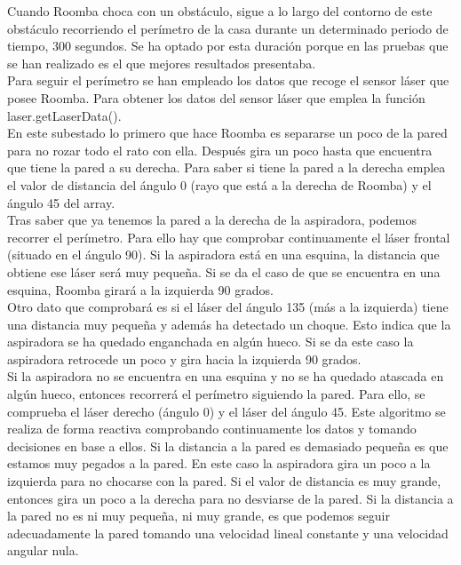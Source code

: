 Cuando Roomba choca con un obstáculo, sigue a lo largo del contorno de este obstáculo recorriendo el perímetro de la casa durante un determinado periodo de tiempo, 300 segundos. Se ha optado por esta duración porque en las pruebas que se han realizado es el que mejores resultados presentaba.\\

Para seguir el perímetro se han empleado los datos que recoge el sensor láser que posee Roomba. Para obtener los datos del sensor láser que emplea la función laser.getLaserData(). \\

En este subestado lo primero que hace Roomba es separarse un poco de la pared para no rozar todo el rato con ella. Después gira un poco hasta que encuentra que tiene la pared a su derecha. Para saber si tiene la pared a la derecha emplea el valor de distancia del ángulo 0 (rayo que está a la derecha de Roomba) y el ángulo 45 del array.\\

Tras saber que ya tenemos la pared a la derecha de la aspiradora, podemos recorrer el perímetro. Para ello hay que comprobar continuamente el láser frontal (situado en el ángulo 90). Si la aspiradora está en una esquina, la distancia que obtiene ese láser será muy pequeña. Si se da el caso de que se encuentra en una esquina, Roomba girará a la izquierda 90 grados. \\

Otro dato que comprobará es si el láser del ángulo 135 (más a la izquierda) tiene una distancia muy pequeña y además ha detectado un choque. Esto indica que la aspiradora se ha quedado enganchada en algún hueco. Si se da este caso la aspiradora retrocede un poco y gira hacia la izquierda 90 grados.\\

Si la aspiradora no se encuentra en una esquina y no se ha quedado atascada en algún hueco, entonces recorrerá el perímetro siguiendo la pared. Para ello, se comprueba el láser derecho (ángulo 0) y el láser del ángulo 45. Este algoritmo se realiza de forma reactiva comprobando continuamente los datos y tomando decisiones en base a ellos. Si la distancia a la pared es demasiado pequeña es que estamos muy pegados a la pared. En este caso la aspiradora gira un poco a la izquierda para no chocarse con la pared. Si el valor de distancia es muy grande, entonces gira un poco a la derecha para no desviarse de la pared. Si la distancia a la pared no es ni muy pequeña, ni muy grande, es que podemos seguir adecuadamente la pared tomando una velocidad lineal constante y una velocidad angular nula.\\


